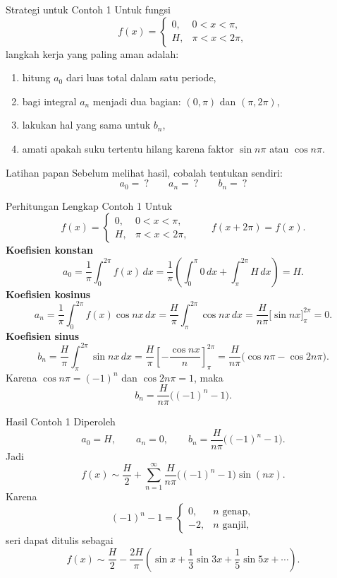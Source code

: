 \documentclass[aspectratio=169,10pt]{beamer}
\begin{document}
\begin{frame}{Strategi untuk Contoh 1}
Untuk fungsi
\[
f(x)=
\begin{cases}
0, & 0<x<\pi,\\
H, & \pi<x<2\pi,
\end{cases}
\]
langkah kerja yang paling aman adalah:
\begin{enumerate}
  \item hitung \(a_0\) dari luas total dalam satu periode,
  \item bagi integral \(a_n\) menjadi dua bagian: \((0,\pi)\) dan \((\pi,2\pi)\),
  \item lakukan hal yang sama untuk \(b_n\),
  \item amati apakah suku tertentu hilang karena faktor \(\sin n\pi\) atau \(\cos n\pi\).
\end{enumerate}
\begin{block}{Latihan papan}
Sebelum melihat hasil, cobalah tentukan sendiri:
\[
a_0=\ ? \qquad a_n=\ ? \qquad b_n=\ ?
\]
\end{block}
\end{frame}


\begin{frame}{Perhitungan Lengkap Contoh 1}
\scriptsize
Untuk
\[
f(x)=\begin{cases}0,&0<x<\pi,\\ H,&\pi<x<2\pi,
\end{cases}
\qquad f(x+2\pi)=f(x).
\]
\textbf{Koefisien konstan}
\[
a_0=\frac{1}{\pi}\int_0^{2\pi}f(x)\,dx
=\frac{1}{\pi}\left(\int_0^\pi 0\,dx+\int_\pi^{2\pi}H\,dx\right)=H.
\]
\textbf{Koefisien kosinus}
\[
a_n=\frac{1}{\pi}\int_0^{2\pi}f(x)\cos nx\,dx
=\frac{H}{\pi}\int_\pi^{2\pi}\cos nx\,dx
=\frac{H}{n\pi}\bigl[\sin nx\bigr]_\pi^{2\pi}=0.
\]
\textbf{Koefisien sinus}
\[
b_n=\frac{H}{\pi}\int_\pi^{2\pi}\sin nx\,dx
=\frac{H}{\pi}\left[-\frac{\cos nx}{n}\right]_\pi^{2\pi}
=\frac{H}{n\pi}\bigl(\cos n\pi-\cos 2n\pi\bigr).
\]
Karena \(\cos n\pi=(-1)^n\) dan \(\cos 2n\pi=1\), maka
\[
b_n=\frac{H}{n\pi}\bigl((-1)^n-1\bigr).
\]
\end{frame}

\begin{frame}{Hasil Contoh 1}
Diperoleh
\[
a_0=H,
\qquad
 a_n=0,
\qquad
 b_n=\frac{H}{n\pi}\bigl((-1)^n-1\bigr).
\]
Jadi
\[
f(x)\sim \frac{H}{2}+\sum_{n=1}^{\infty}\frac{H}{n\pi}\bigl((-1)^n-1\bigr)\sin(nx).
\]
Karena
\[
(-1)^n-1=
\begin{cases}
0, & n \text{ genap},\\
-2, & n \text{ ganjil},
\end{cases}
\]
seri dapat ditulis sebagai
\[
f(x)\sim \frac{H}{2}-\frac{2H}{\pi}\left(\sin x+\frac{1}{3}\sin 3x+\frac{1}{5}\sin 5x+\cdots\right).
\]
\end{frame}
\end{document}
